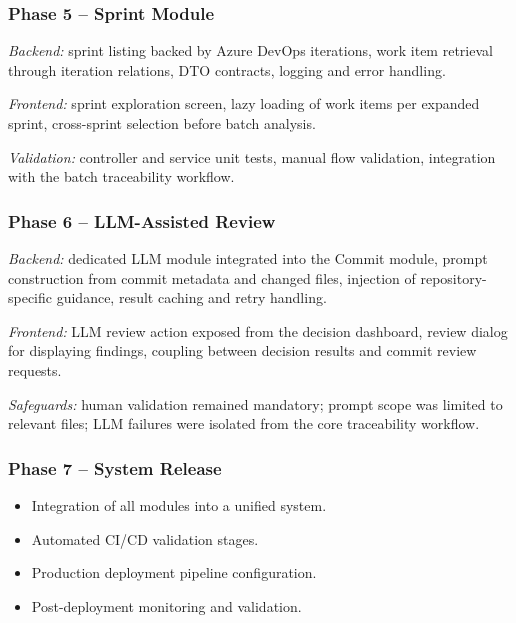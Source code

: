 \subsubsection{Phase 5 -- Sprint Module}

\textit{Backend:} sprint listing backed by Azure DevOps iterations, work item
retrieval through iteration relations, DTO contracts, logging and error
handling.

\textit{Frontend:} sprint exploration screen, lazy loading of work items per
expanded sprint, cross-sprint selection before batch analysis.

\textit{Validation:} controller and service unit tests, manual flow validation,
integration with the batch traceability workflow.

\subsubsection{Phase 6 -- LLM-Assisted Review}

\textit{Backend:} dedicated LLM module integrated into the Commit module,
prompt construction from commit metadata and changed files, injection of
repository-specific guidance, result caching and retry handling.

\textit{Frontend:} LLM review action exposed from the decision dashboard,
review dialog for displaying findings, coupling between decision results and
commit review requests.

\textit{Safeguards:} human validation remained mandatory; prompt scope was
limited to relevant files; LLM failures were isolated from the core
traceability workflow.

\subsubsection{Phase 7 -- System Release}

\begin{itemize}
  \item Integration of all modules into a unified system.
  \item Automated CI/CD validation stages.
  \item Production deployment pipeline configuration.
  \item Post-deployment monitoring and validation.
\end{itemize}

